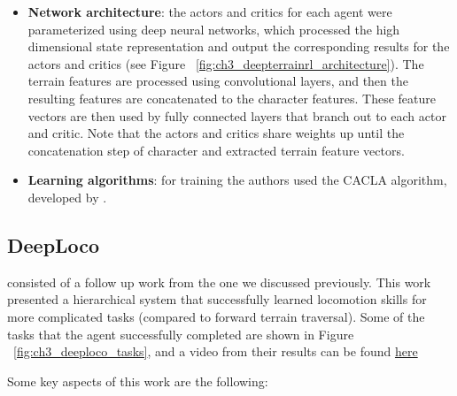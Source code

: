 \begin{itemize}
    \item \textbf{Network architecture}: the actors and critics for each
          agent were parameterized using deep neural networks, which processed the
          high dimensional state representation and output the corresponding results
          for the actors and critics (see Figure ~\ref{fig:ch3_deepterrainrl_architecture}).
          The terrain features are processed using convolutional layers, and then
          the resulting features are concatenated to the character features. These
          feature vectors are then used by fully connected layers that branch out
          to each actor and critic. Note that the actors and critics share weights
          up until the concatenation step of character and extracted terrain feature vectors.

          \figDeepTerrainRLArchitecture

    \item \textbf{Learning algorithms}: for training the authors used the CACLA 
          algorithm, developed by \cite{CACLA}.

\end{itemize}

\subsection{DeepLoco}

\cite{DeepLoco} consisted of a follow up work from the one we discussed previously.
This work presented a hierarchical system that successfully learned locomotion skills
for more complicated tasks (compared to forward terrain traversal). Some of the tasks
that the agent successfully completed are shown in Figure ~\ref{fig:ch3_deeploco_tasks},
and a video from their results can be found \href{https://youtu.be/hd1yvLWm6oA}{here}

\figDeepLocoTasks

Some key aspects of this work are the following:

